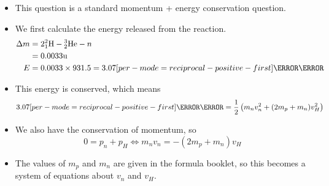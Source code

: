 \documentclass[a4paper,12pt]{article}
\let\oldsi\si
\renewcommand{\si}[1]{\oldsi[per-mode=reciprocal-positive-first]{#1}}
\newcommand{\atom}[3]{{}^{#1}_{#2}\text{#3}}
\begin{document}
\begin{itemize}
  \item This question is a standard momentum + energy conservation question.
  \item We first calculate the energy released from the reaction.
        \begin{align*}
          \Delta m & = 2\atom{2}{1}{H} - \atom{3}{2}{He} - n                      \\
                   & = 0.0033 \text{u}                                            \\
          E        & = 0.0033 \times 931.5                   = 3.07 \si{\mega\eV}
        \end{align*}
  \item This energy is conserved, which means
        $$3.07 \si{\mega\eV} = \frac{1}{2}\left(m_nv_n^2 + (2m_p + m_n)v_H^2\right)$$
  \item We also have the conservation of momentum, so $$0 = p_n + p_H \iff m_nv_n = -(2m_p + m_n)v_H$$
  \item The values of $m_p$ and $m_n$ are given in the formula booklet, so this becomes a system of equations about $v_n$ and $v_H$.
\end{itemize}

\pagebreak
\end{document}

